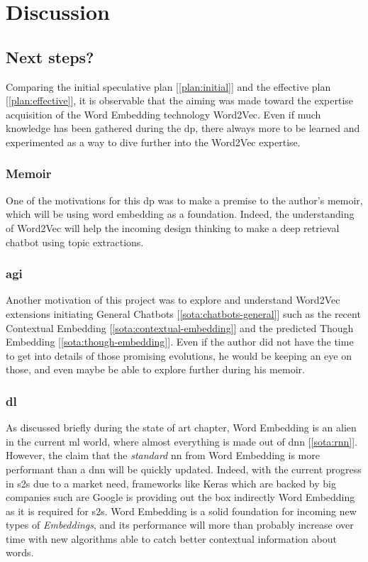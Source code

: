 \chapter{Discussion}
\label{chap:discussion}

\section{Next steps?}
Comparing the initial speculative plan [\ref{plan:initial}] and the effective plan [\ref{plan:effective}], it is observable that the aiming was made toward the expertise acquisition of the Word Embedding technology Word2Vec. Even if much knowledge has been gathered during the \gls{dp}, there always more to be learned and experimented as a way to dive further into the Word2Vec expertise.

\subsection{Memoir}
One of the motivations for this \gls{dp} was to make a premise to the author's memoir, which will be using word embedding as a foundation. Indeed, the understanding of Word2Vec will help the incoming design thinking to make a deep retrieval chatbot using topic extractions.

\subsection{\gls{agi}}
Another motivation of this project was to explore and understand Word2Vec extensions initiating General Chatbots [\ref{sota:chatbots-general}] such as the recent Contextual Embedding [\ref{sota:contextual-embedding}] and the predicted Though Embedding [\ref{sota:though-embedding}]. Even if the author did not have the time to get into details of those promising evolutions, he would be keeping an eye on those, and even maybe be able to explore further during his memoir.

\subsection{\gls{dl}}
As discussed briefly during the state of art chapter, Word Embedding is an alien in the current \gls{ml} world, where almost everything is made out of \gls{dnn} [\ref{sota:rnn}]. However, the claim that the \textit{standard} {nn} from Word Embedding is more performant than a \gls{dnn} will be quickly updated. Indeed, with the current progress in \gls{s2s} due to a market need, frameworks like Keras which are backed by big companies such are Google is providing out the box indirectly Word Embedding as it is required for \gls{s2s}. Word Embedding is a solid foundation for incoming new types of \textit{Embeddings}, and its performance will more than probably increase over time with new algorithms able to catch better contextual information about words.

